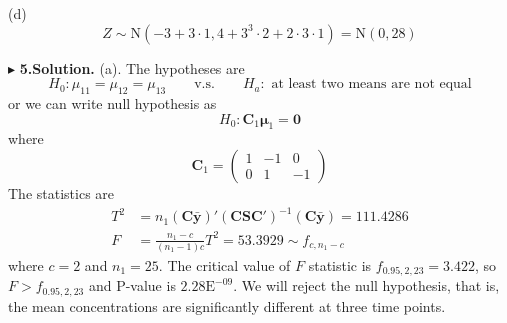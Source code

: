 \documentclass[letterpaper, 12pt]{article}
\newcommand{\ba}{$$\begin{aligned}}
\newcommand{\ea}{\end{aligned}$$}
\newcommand{\lma}{\left(\begin{matrix}}
\newcommand{\rma}{\end{matrix}\right)}
\begin{document}
(d) 
$$
Z\sim\text{N}(-3+3\cdot1,4+3^3\cdot2+2\cdot3\cdot1)=\text{N}(0,28)
$$

$\blacktriangleright$ \textbf{5.\quad Solution.}
(a). The hypotheses are
$$
H_0:\mu_{11}=\mu_{12}=\mu_{13}\qquad\text{v.s.}\qquad H_a: \text{ at least two means are not equal}
$$
or we can write null hypothesis as
$$
H_0: \bm{C}_1\bm{\mu}_1=\bm{0}
$$
where
$$
\bm{C}_1=\lma 1 &-1 &0\\ 0 &1 &-1\rma
$$
The statistics are
\ba
T^2&=n_1(\bm{C\bar{y}})'(\bm{CSC}')^{-1}(\bm{C\bar{y}})=111.4286\\
F&=\frac{n_1-c}{(n_1-1)c}T^2=53.3929\sim f_{c,n_1-c}
\ea
where $c=2$ and $n_1=25$. The critical value of $F$ statistic is $f_{0.95,2,23}=3.422$, so $F>f_{0.95,2,23}$ and P-value is $2.28\text{E}^{-09}$. We will reject the  null hypothesis, that is, the mean concentrations are significantly different at three time points.
\end{document}
